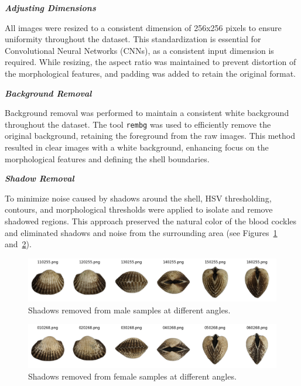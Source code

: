 \textbf{\textit{Adjusting Dimensions}}

All images were resized to a consistent dimension of 256x256 pixels to ensure uniformity throughout the dataset. This standardization is essential for Convolutional Neural Networks (CNNs), as a consistent input dimension is required. While resizing, the aspect ratio was maintained to prevent distortion of the morphological features, and padding was added to retain the original format.

\textbf{\textit{Background Removal}}

Background removal was performed to maintain a consistent white background throughout the dataset. The tool \texttt{rembg} was used to efficiently remove the original background, retaining the foreground from the raw images. This method resulted in clear images with a white background, enhancing focus on the morphological features and defining the shell boundaries.

\textbf{\textit{Shadow Removal}}

To minimize noise caused by shadows around the shell, HSV thresholding, contours, and morphological thresholds were applied to isolate and remove shadowed regions. This approach preserved the natural color of the blood cockles and eliminated shadows and noise from the surrounding area (see Figures~\ref{fig:m_noshadow} and~\ref{fig:f_noshadow}).

\begin{figure}[h]
	\centering
	\includegraphics[width=\textwidth]{figures/male_shadows_removed.png}
	\caption{Shadows removed from male samples at different angles.}
	\label{fig:m_noshadow}
\end{figure}

\begin{figure}[h]
	\centering
	\includegraphics[width=\textwidth]{figures/female_shadows_removed.png}
	\caption{Shadows removed from female samples at different angles.}
	\label{fig:f_noshadow}
\end{figure}

